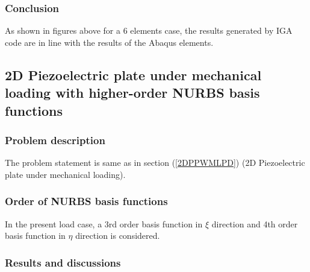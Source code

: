 \documentclass[11pt]{article}
\begin{document}
\subsubsection{Conclusion}
As shown in figures above for a 6 elements case, the results generated by IGA code are in line with the results of the Abaqus elements.  

\subsection{2D Piezoelectric plate under mechanical loading with higher-order NURBS basis functions }
\subsubsection{Problem description}

The problem statement is same as in section (\ref{2DPPWMLPD}) (2D Piezoelectric plate under mechanical loading).

\subsubsection{Order of NURBS basis functions}
In the present load case, a 3rd order basis function in $\xi$ direction and 4th order basis function in $\eta$ direction is considered.

\subsubsection{Results and discussions}
\end{document}
